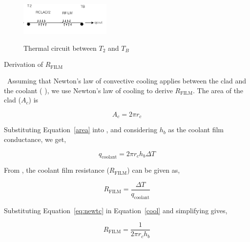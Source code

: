 \begin{figure}
\begin{center}
{
 \includegraphics[width=0.4\textwidth]{electricalcircuit2.png}
}
\caption{\label{Fig_ElectCirc2} Thermal circuit between $T_2$ and $T_B$}
\end{center}
\end{figure}

\begin{bf}
Derivation of $R_{\text{FILM}}$
\end{bf}

~\newline Assuming that Newton's law of convective cooling applies between the
clad and the coolant ( ), we use Newton's law of cooling to
derive $R_{\text{FILM}}$.  The area of the clad ($A_c$) is

\begin{equation}
A_c= 2 \pi r_c \label{area}
\end{equation}

Substituting Equation~\ref{area} into , and considering $h_b$ as the
coolant film conductance, we get,

\begin{equation}
q_{\text{coolant}}=  2\pi r_c h_b \Delta T \label{eq:newtc}
\end{equation}

From , the coolant film resistance ($R_{\mathrm{FILM}}$)
can be given as, 

\begin{equation}
R_{\mathrm{FILM}}=\frac{\Delta T}{q_{\text{coolant}}} \label{cool}
\end{equation}

Substituting Equation~\ref{eq:newtc} in Equation~\ref{cool} and simplifying
gives,

\begin{equation}
R_{\mathrm{FILM}}=\frac{1}{2\pi r_c h_b}
\end{equation} 

